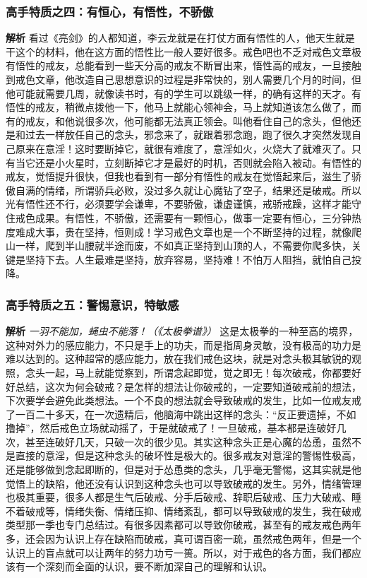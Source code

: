 \subsubsection{高手特质之四：有恒心，有悟性，不骄傲}

\textbf{解析} 看过《亮剑》的人都知道，李云龙就是在打仗方面有悟性的人，他天生就是干这个的材料，他在这方面的悟性比一般人要好很多。戒色吧也不乏对戒色文章极有悟性的戒友，总能看到一些天分高的戒友不断冒出来，悟性高的戒友，一旦接触到戒色文章，他改造自己思想意识的过程是非常快的，别人需要几个月的时间，但他可能就需要几周，就像读书时，有的学生可以跳级一样，的确有这样的天才。有悟性的戒友，稍微点拨他一下，他马上就能心领神会，马上就知道该怎么做了，而有的戒友，和他说很多次，他可能都无法真正领会。叫他看住自己的念头，但他还是和过去一样放任自己的念头，邪念来了，就跟着邪念跑，跑了很久才突然发现自己原来在意淫！这时要断掉它，就很有难度了，意淫如火，火烧大了就难灭了。只有当它还是小火星时，立刻断掉它才是最好的时机，否则就会陷入被动。有悟性的戒友，觉悟提升很快，但我也看到有一部分有悟性的戒友在觉悟起来后，滋生了骄傲自满的情绪，所谓骄兵必败，没过多久就让心魔钻了空子，结果还是破戒。所以光有悟性还不行，必须要学会谦卑，不要骄傲，谦虚谨慎，戒骄戒躁，这样才能守住戒色成果。有悟性，不骄傲，还需要有一颗恒心，做事一定要有恒心，三分钟热度难成大事，贵在坚持，恒则成！学习戒色文章也是一个不断坚持的过程，就像爬山一样，爬到半山腰就半途而废，不如真正坚持到山顶的人，不需要你爬多快，关键是坚持下去。人生最难是坚持，放弃容易，坚持难！不怕万人阻挡，就怕自己投降。

\subsubsection{高手特质之五：警惕意识，特敏感}

\textbf{解析} \textit{一羽不能加，蝇虫不能落！（《太极拳谱》）} 这是太极拳的一种至高的境界，这种对外力的感应能力，不只是手上的功夫，而是指周身灵敏，没有极高的功力是难以达到的。这种超常的感应能力，放在我们戒色这块，就是对念头极其敏锐的观照，念头一起，马上就能觉察到，所谓念起即觉，觉之即无！每次破戒，你都要好好总结，这次为何会破戒？是怎样的想法让你破戒的，一定要知道破戒前的想法，下次要学会避免此类想法。一个不良的想法就会导致破戒的发生，比如一位戒友戒了一百二十多天，在一次遗精后，他脑海中跳出这样的念头：“反正要遗掉，不如撸掉”，然后戒色立场就动摇了，于是就破戒了！一旦破戒，基本都是连破好几次，甚至连破好几天，只破一次的很少见。其实这种念头正是心魔的怂恿，虽然不是直接的意淫，但是这种念头的破坏性是极大的。很多戒友对意淫的警惕性极高，还是能够做到念起即断的，但是对于怂恿类的念头，几乎毫无警惕，这其实就是他觉悟上的缺陷，他还没有认识到这种念头也可以导致破戒的发生。另外，情绪管理也极其重要，很多人都是生气后破戒、分手后破戒、辞职后破戒、压力大破戒、睡不着破戒等，情绪失衡、情绪压抑、情绪紊乱，都可以导致破戒的发生，我在破戒类型那一季也专门总结过。有很多因素都可以导致你破戒，甚至有的戒友戒色两年多，还会因为认识上存在缺陷而破戒，真可谓百密一疏，虽然戒色两年，但是一个认识上的盲点就可以让两年的努力功亏一篑。所以，对于戒色的各方面，我们都应该有一个深刻而全面的认识，要不断加深自己的理解和认识。


